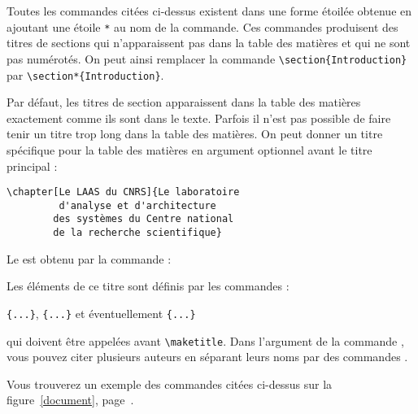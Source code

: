 Toutes les commandes citées ci-dessus existent dans une forme
\og étoilée \fg{} obtenue en ajoutant une étoile \verb|*| au nom de la
commande. Ces commandes produisent des titres de sections qui
n'apparaissent pas dans la table des matières et qui ne sont pas
numérotés. On peut ainsi remplacer la commande
\verb|\section{Introduction}| par
\verb|\section*{Introduction}|.

Par défaut, les titres de section apparaissent dans la table des
matières exactement comme ils sont dans le texte. Parfois il n'est pas
possible de faire tenir un titre trop long dans la table des
matières. On peut donner un titre spécifique pour la table des
matières en argument optionnel avant le titre principal :
\begin{code}
\verb|\chapter[Le LAAS du CNRS]{Le laboratoire|\\
\verb|         d'analyse et d'architecture|\\
\verb|        des systèmes du Centre national|\\
\verb|        de la recherche scientifique}|
\end{code}

Le  est obtenu par la commande :
\begin{lscommand}
\end{lscommand}
Les éléments de ce titre sont définis par les commandes :
\begin{lscommand}
\verb|{...}|, \verb|{...}|
et éventuellement \verb|{...}|
\end{lscommand}
\noindent qui doivent être appelées avant \verb|\maketitle|. Dans
l'argument de la commande , vous pouvez citer plusieurs
auteurs en séparant leurs noms par des commandes .

Vous trouverez un exemple des commandes citées ci-dessus sur la
figure~\ref{document}, page~\pageref{document}.

